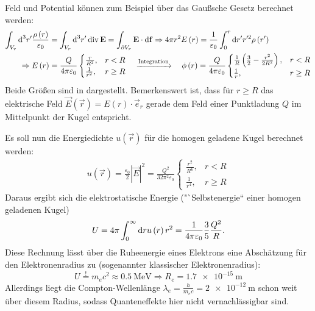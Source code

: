 Feld und Potential können zum Beispiel über das Gaußsche Gesetz berechnet werden:
\begin{align*}
		\int _{{V_{r}}}\text{d} ^{3}r'\frac{\rho \left(r\right)}{\varepsilon _{0}}&=\int _{{V_{r}}}\text{d} ^{3}r'\operatorname{div} \mathbf{E}=\int _{\partial {V_{r}}}\mathbf{E}\cdot \text{d} \mathbf{f}\Rightarrow 4\pi r^{2}E\left(r\right)=\frac{1}{\varepsilon _{0}}\int _{0}^{r}\text{d} r'r'^{2}\rho \left(r'\right) \\
		\Rightarrow E\left(r\right)&=\frac{Q}{4\pi \varepsilon _{0}}
		\begin{cases} \frac{r}{R^{2}}, & r<R     \\
              \frac{1}{r^{2}}, & r\geq R
		\end{cases} \quad\xrightarrow{\text{Integration}}\quad \phi \left(r\right)=\frac{Q}{4\pi \varepsilon _{0}}
		\begin{cases} \frac{1}{R}\left(\frac{3}{2}-\frac{r^{2}}{2R^{2}}\right), & r<R     \\
              \frac{1}{r},  & r\geq R
		\end{cases}
\end{align*}
Beide Größen sind in  dargestellt. Bemerkenswert ist, dass für $r\geq R$ das elektrische Feld $\vec {E}\left(\vec {r}\right)=E\left(r\right)\cdot \vec {e}_{r}$ gerade dem Feld einer Punktladung $Q$ im Mittelpunkt der Kugel entspricht.

Es soll nun die Energiedichte $u\left(\vec {r}\right)$ für die homogen geladene Kugel berechnet werden:
\begin{align*}
	u\left(\vec {r}\right)=\frac{\varepsilon _{0}}{2}\left| \vec {E}\right| ^{2}=\frac{Q^{2}}{32\pi ^{2}\varepsilon _{0}}\begin{cases} \frac{r^{2}}{R^{6}}, & r<R     \\
              \frac{1}{r^{4}},     & r\geq R
    \end{cases}
\end{align*}
Daraus ergibt sich die elektrostatische Energie ("`Selbstenergie`` einer homogen geladenen Kugel)
\begin{equation*}
	U=4\pi \int _{0}^{\infty }\text{d} ru\left(r\right)r^{2}=\frac{1}{4\pi \varepsilon _{0}}\frac{3}{5}\frac{Q^{2}}{R}.
\end{equation*}
Diese Rechnung lässt über die Ruheenergie eines Elektrons eine Abschätzung für den Elektronenradius zu (sogenannter klassischer Elektronenradius):
\begin{equation*}
	U\overset{!}{=} m_{e}c^{2}\approx \SI{0.5}{\mega\eV}\Rightarrow R_{e}= \SI{1,7e-15}{\m}
\end{equation*}
Allerdings liegt die Compton-Wellenlänge $\lambda _{e}=\frac{h}{m_{e}c}=\SI{2e-12}{\m}$ schon weit über diesem Radius, sodass Quanteneffekte hier nicht vernachlässigbar sind.



